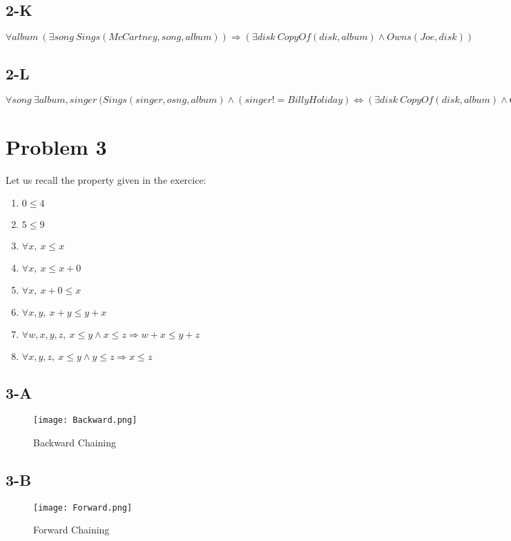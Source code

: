 \documentclass{article}
\begin{document}
        \subsection{2-K}
            $\forall album\: (\exists song\: Sings(McCartney, song, album))\Rightarrow(\exists disk\: CopyOf(disk, album)\land Owns(Joe, disk))$
        \subsection{2-L}
            $\forall song\: \exists album, singer\: (Sings(singer, osng, album)\land(singer!=Billy Holiday) \Leftrightarrow (\exists disk\: CopyOf(disk, album)\land Owns(Joe, disk))$
    \section{Problem 3}
        Let us recall the property given in the exercice:
        \begin{enumerate}
            \item $0\le 4$
            \item $5\le 9$
            \item $\forall x,\: x\le x$
            \item $\forall x,\: x\le x+0$
            \item $\forall x,\: x+0\le x$
            \item $\forall x,y,\: x+y\le y+x$
            \item $\forall w,x,y,z,\: x\le y\land x\le z \Rightarrow w+x\le y+z$
            \item $\forall x,y,z,\: x\le y\land y\le z\Rightarrow x\le z$
        \end{enumerate}
        \subsection{3-A}
            \begin{figure}[h]
                \centering
                \texttt{[image: Backward.png]}
                \caption{Backward Chaining}
                \label{BackwardChaining}
            \end{figure}
        \subsection{3-B}
            \begin{figure}[h]
                \centering
                \texttt{[image: Forward.png]}
                \caption{Forward Chaining}
                \label{ForwardChaining}
            \end{figure}
\end{document}
